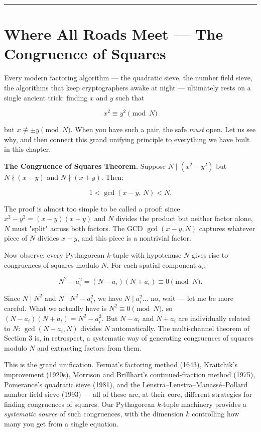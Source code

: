 \documentclass[11pt,openany]{book}
\theoremstyle{definition}
\theoremstyle{plain}
\theoremstyle{remark}
\begin{document}
\bigskip\noindent\rule{\textwidth}{0.4pt}\bigskip


\section*{Where All Roads Meet — The Congruence of Squares}


Every modern factoring algorithm — the quadratic sieve, the number field sieve, the algorithms that keep cryptographers awake at night — ultimately rests on a single ancient trick: finding $x$ and $y$ such that

$$x^2 \equiv y^2 \pmod{N}$$

but $x \not\equiv \pm y \pmod{N}$. When you have such a pair, the safe \textit{must} open. Let us see why, and then connect this grand unifying principle to everything we have built in this chapter.

\textbf{The Congruence of Squares Theorem.} Suppose $N \mid (x^2 - y^2)$ but $N \nmid (x - y)$ and $N \nmid (x + y)$. Then:

$$1 < \gcd(x - y, \, N) < N.$$

The proof is almost too simple to be called a proof: since $x^2 - y^2 = (x - y)(x + y)$ and $N$ divides the product but neither factor alone, $N$ must "split" across both factors. The GCD $\gcd(x - y, N)$ captures whatever piece of $N$ divides $x - y$, and this piece is a nontrivial factor.

Now observe: every Pythagorean $k$-tuple with hypotenuse $N$ gives rise to congruences of squares modulo $N$. For each spatial component $a_i$:

$$N^2 - a_i^2 = (N - a_i)(N + a_i) \equiv 0 \pmod{N}.$$

Since $N \mid N^2$ and $N \mid N^2 - a_i^2$, we have $N \mid a_i^2$... no, wait — let me be more careful. What we actually have is $N^2 \equiv 0 \pmod{N}$, so $(N - a_i)(N + a_i) = N^2 - a_i^2$. But $N - a_i$ and $N + a_i$ are individually related to $N$: $\gcd(N - a_i, N)$ divides $N$ automatically. The multi-channel theorem of Section 3 is, in retrospect, a systematic way of generating congruences of squares modulo $N$ and extracting factors from them.

This is the grand unification. Fermat's factoring method (1643), Kraitchik's improvement (1920s), Morrison and Brillhart's continued-fraction method (1975), Pomerance's quadratic sieve (1981), and the Lenstra–Lenstra–Manassé–Pollard number field sieve (1993) — all of these are, at their core, different strategies for finding congruences of squares. Our Pythagorean $k$-tuple machinery provides a \textit{systematic source} of such congruences, with the dimension $k$ controlling how many you get from a single equation.
\end{document}
